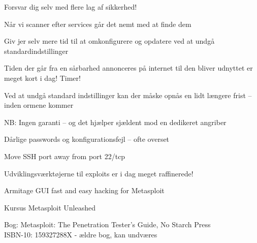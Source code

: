\documentclass[20pt,landscape,a4paper,footrule]{foils}
\begin{document}
\centerline{Forsvar dig selv med flere lag af sikkerhed! }



\begin{list1}
\item Når vi scanner efter services går det nemt med at finde dem
\item Giv jer selv mere tid til at omkonfigurere og opdatere ved at undgå standardindstillinger
\item Tiden der går fra en sårbarhed annonceres på internet til den
  bliver udnyttet er meget kort i dag! Timer!
\item Ved at undgå standard indstillinger kan der
  måske opnås en lidt længere frist -- inden ormene kommer
\item NB: Ingen garanti -- og det hjælper sjældent mod en dedikeret angriber
\item Dårlige passwords og konfigurationsfejl -- ofte overset
\end{list1}

\centerline{Move SSH port away from port 22/tcp}




\centerline{}




\begin{list1}
\item Udviklingsværktøjerne til exploits er i dag meget raffinerede!
\item {}
\item Armitage GUI fast and easy hacking for Metasploit\\
\item Kursus Metasploit Unleashed\\
\item Bog: Metasploit: The Penetration Tester's Guide, No Starch Press\\
ISBN-10: 159327288X - ældre bog, kan undværes
\end{list1}


\end{document}
